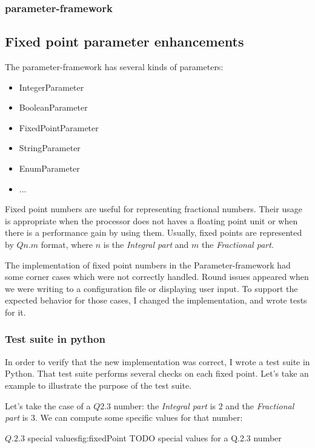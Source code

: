 \subsubsection{parameter-framework}

\subsection{Fixed point parameter enhancements}
The parameter-framework has several kinds of parameters:
\begin{itemize}
    \item IntegerParameter
    \item BooleanParameter
    \item FixedPointParameter
    \item StringParameter
    \item EnumParameter
    \item ...
\end{itemize}

Fixed point numbers are useful for representing fractional numbers. Their
usage is appropriate when the processor does not haves a floating point unit
or when there is a performance gain by using them. Usually, fixed points are
represented by $Qn.m$ format, where $n$ is the \emph{Integral part} and $m$ the
\emph{Fractional part}.

The implementation of fixed point numbers in the Parameter-framework had some
corner cases which were not correctly handled. Round issues appeared when we
were writing to a configuration file or displaying user input. To
support the expected behavior for those cases, I changed the implementation, and
wrote tests for it.

\subsubsection{Test suite in python}

In order to verify that the new implementation was correct, I wrote a test suite
in Python. That test suite performs several checks on each fixed point. Let's
take an example to illustrate the purpose of the test suite.

Let's take the case of a $Q2.3$ number: the \emph{Integral part} is $2$ and the
\emph{Fractional part} is $3$. We can compute some specific values for that number:

\begin{figureGraphics}{$Q.2.3$ special values}{fig:fixedPoint}
    TODO special values for a Q.2.3 number
\end{figureGraphics}

